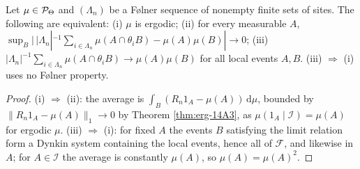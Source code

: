 \begin{proposition}[Georgii (14.7)]
    \label{prop:erg-147}
    \leanok

    Let $\mu \in \mathcal{P}_\Theta$ and $(\Lambda_n)$ be a F\o lner sequence of nonempty finite
    sets of sites. The following are equivalent: (i) $\mu$ is ergodic; (ii) for every measurable
    $A$, $\sup_B |\,|\Lambda_n|^{-1}\sum_{i \in \Lambda_n}\mu(A \cap \theta_i B) - \mu(A)\mu(B)| \to 0$;
    (iii) $|\Lambda_n|^{-1}\sum_{i\in\Lambda_n}\mu(A \cap \theta_i B) \to \mu(A)\mu(B)$ for all
    local events $A, B$. (iii) $\Rightarrow$ (i) uses no F\o lner property.
\end{proposition}
\begin{proof}
    \leanok

    (i) $\Rightarrow$ (ii): the average is $\int_B (R_n 1_A - \mu(A))\,\mathrm{d}\mu$, bounded
    by $\|R_n 1_A - \mu(A)\|_1 \to 0$ by Theorem \ref{thm:erg-14A3}, as
    $\mu(1_A \mid \mathcal{I}) = \mu(A)$ for ergodic $\mu$. (iii) $\Rightarrow$ (i): for fixed
    $A$ the events $B$ satisfying the limit relation form a Dynkin system containing the local
    events, hence all of $\mathcal{F}$, and likewise in $A$; for $A \in \mathcal{I}$ the average
    is constantly $\mu(A)$, so $\mu(A) = \mu(A)^2$.
\end{proof}


